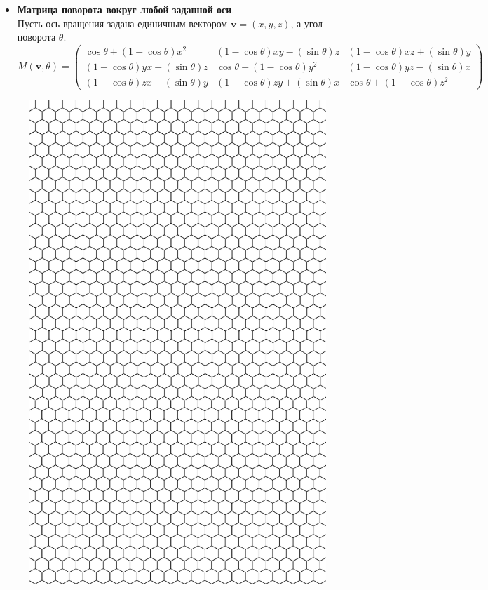 \documentclass[10pt]{article}
\begin{document}
\begin{itemize}
\item \textbf{Матрица поворота вокруг любой заданной оси}.\\
Пусть ось вращения задана единичным вектором $\mathbf{v} = (x,y,z)$, а угол поворота $\theta$.
\begin{equation*}
  M(\mathbf{v}, \theta) = \left(
  \begin{array}{cccc}
  \cos{\theta} + (1 - \cos{\theta})x^2 & (1 - \cos{\theta})xy - (\sin{\theta})z & (1 - \cos{\theta})xz + (\sin{\theta})y\\
  (1 - \cos{\theta})yx + (\sin{\theta})z & \cos{\theta} + (1 - \cos{\theta})y^2 & (1 - \cos{\theta})yz - (\sin{\theta})x\\
  (1 - \cos{\theta})zx - (\sin{\theta})y & (1 - \cos{\theta})zy + (\sin{\theta})x & \cos{\theta} + (1 - \cos{\theta})z^2
  \end{array}
  \right)
\end{equation*}
\end{itemize}
\newpage
\begin{figure}[h]

  \centering
  
  \includegraphics[width=0.8\linewidth]{hex.png}
  
  \label{fig:mpr}
  
  \end{figure}
\end{document}
